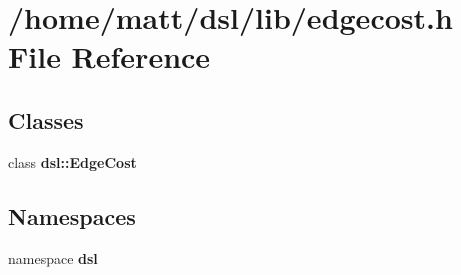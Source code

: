 \section{/home/matt/dsl/lib/edgecost.h \-File \-Reference}
\label{edgecost_8h}
\subsection*{\-Classes}
\begin{DoxyCompactItemize}
\item 
class {\bf dsl\-::\-Edge\-Cost}
\end{DoxyCompactItemize}
\subsection*{\-Namespaces}
\begin{DoxyCompactItemize}
\item 
namespace {\bf dsl}
\end{DoxyCompactItemize}
